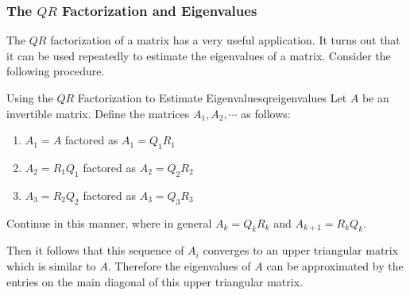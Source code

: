 \subsubsection{The $QR$ Factorization and Eigenvalues}

The $QR$ factorization of a matrix has a very useful application. It turns out that it can be used repeatedly to estimate the eigenvalues of a matrix. Consider the following procedure.

\begin{procedure}{Using the $QR$ Factorization to Estimate Eigenvalues}{qreigenvalues}
Let $A$ be an invertible matrix. Define the matrices $A_1, A_2, \cdots$ as follows:
\begin{enumerate}
\item 
$A_1 = A$ factored as $A_1 = Q_1R_1$
\item 
$A_2 = R_1Q_1$ factored as $A_2 = Q_2R_2$
\item 
$A_3 = R_2Q_2$ factored as $A_3 = Q_3R_3$
\end{enumerate}

Continue in this manner, where in general $A_k = Q_kR_k$ and $A_{k+1} = R_kQ_k$. 

Then it follows that this sequence of $A_i$ converges to an upper triangular matrix which is similar to $A$. Therefore the eigenvalues of $A$ can be approximated by the entries on the main diagonal of this upper triangular matrix. 
\end{procedure}